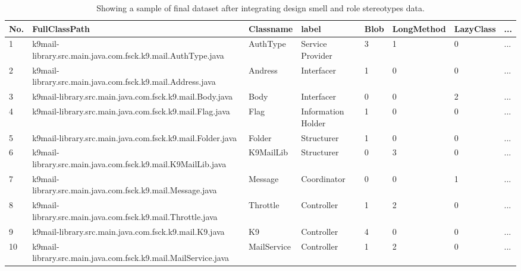 \documentclass[AMA,Times1COL]{WileyNJDv5} %
\begin{document}
	\begin{table}[!t]
	\centering %
	\caption{Showing a sample of final dataset after integrating design smell and role stereotypes data.} %
	\begin{tabular*}{\textwidth}{@{\extracolsep\fill}llllllll@{\extracolsep\fill}}%
		
		\toprule
		\textbf{No.}& \textbf{FullClassPath} & \textbf{Classname}& \textbf{label} & \textbf{Blob} &\textbf{LongMethod} &\textbf{ LazyClass} & \textbf{...}  \\ 
		\midrule %
		1 & k9mail-library.src.main.java.com.fsck.k9.mail.AuthType.java & AuthType& Service Provider & 3 & 1 &  0 & ... \\ %
		2 & k9mail-library.src.main.java.com.fsck.k9.mail.Address.java & Andress & Interfacer & 1 & 0 & 0 & ...  \\
		3 & k9mail-library.src.main.java.com.fsck.k9.mail.Body.java & Body & Interfacer & 0 & 0 & 2 &  ... \\
		4 &k9mail-library.src.main.java.com.fsck.k9.mail.Flag.java & Flag & Information Holder & 1 & 0 & 0 & ... \\ 
		5 & k9mail-library.src.main.java.com.fsck.k9.mail.Folder.java & Folder & Structurer & 1 & 0 & 0 & ... \\
		6 &k9mail-library.src.main.java.com.fsck.k9.mail.K9MailLib.java & K9MailLib & Structurer & 0 & 3 & 0 & ... \\
		7 & k9mail-library.src.main.java.com.fsck.k9.mail.Message.java & Message & Coordinator & 0 & 0 & 1 & ... \\
		8 &k9mail-library.src.main.java.com.fsck.k9.mail.Throttle.java & Throttle & Controller & 1 & 2 &0 &  ...  \\
		9 & k9mail-library.src.main.java.com.fsck.k9.mail.K9.java & K9 & Controller & 4 & 0 & 0 & ... \\ 
		10 & k9mail-library.src.main.java.com.fsck.k9.mail.MailService.java & MailService & Controller & 1 & 2 & 0 & ... \\  %
		\bottomrule
	\end{tabular*}
	\label{table:ds_rs_processed} %
\end{table}
	
\end{document}
